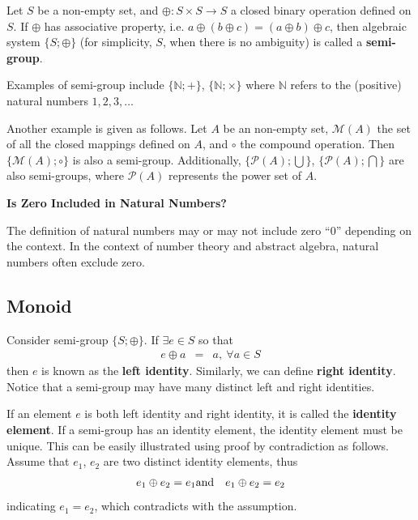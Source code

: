 Let $S$ be a non-empty set, and $\oplus: S\times S \rightarrow S$ a closed binary operation defined on $S$. If $\oplus$ has associative property, i.e. $a\oplus(b\oplus c) = (a \oplus b) \oplus c$, then algebraic system $\{S; \oplus\}$ (for simplicity, $S$, when there is no ambiguity) is called a \textbf{semi-group}.

Examples of semi-group include $\{\mathbb{N}; +\}$, $\{\mathbb{N}; \times\}$ where $\mathbb{N}$ refers to the (positive) natural numbers $1, 2, 3, \ldots$ 

Another example is given as follows. Let $A$ be an non-empty set, $\mathcal{M}(A)$ the set of all the closed mappings defined on $A$, and $\circ$ the compound operation. Then $\{\mathcal{M}(A); \circ\}$ is also a semi-group. Additionally, $\{\mathcal{P}(A); \bigcup\}$, $\{\mathcal{P}(A); \bigcap\}$ are also semi-groups, where $\mathcal{P}(A)$ represents the power set of $A$.

\begin{mdframed}
\noindent \textbf{Is Zero Included in Natural Numbers?}

The definition of natural numbers may or may not include zero ``$0$'' depending on the context. In the context of number theory and abstract algebra, natural numbers often exclude zero.
\end{mdframed}

\subsection{Monoid}

Consider semi-group $\{S; \oplus\}$. If $\exists e\in S$ so that
\begin{eqnarray}
	e\oplus a &=& a, ~\forall a \in S \nonumber
\end{eqnarray}
then $e$ is known as the \textbf{left identity}. Similarly, we can define \textbf{right identity}. Notice that a semi-group may have many distinct left and right identities.

If an element $e$ is both left identity and right identity, it is called the \textbf{identity element}. If a semi-group has an identity element, the identity element must be unique. This can be easily illustrated using proof by contradiction as follows. Assume that $e_1$, $e_2$ are two distinct identity elements, thus
\begin{eqnarray}
	e_1\oplus e_2 = e_1 &\textup{and}& e_1\oplus e_2 = e_2 \nonumber
\end{eqnarray}
indicating $e_1=e_2$, which contradicts with the assumption.

